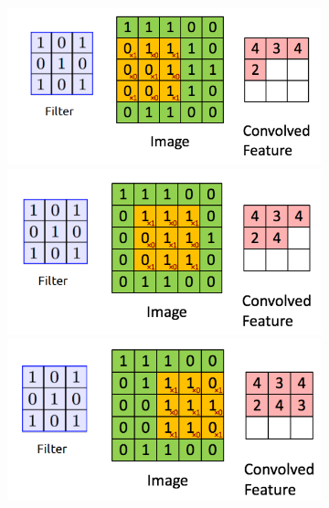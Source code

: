 \documentclass{article}
\begin{document}
\begin{figure}[H]
\begin{figure}[H]
  \includegraphics[width=\linewidth]{img/conv4.png}
\endminipage\hfill
{}
  \includegraphics[width=\linewidth]{img/conv5.png}
\endminipage\hfill
{}%
  \includegraphics[width=\linewidth]{img/conv6.png}
\endminipage
\end{figure}


\end{figure}
\end{document}
